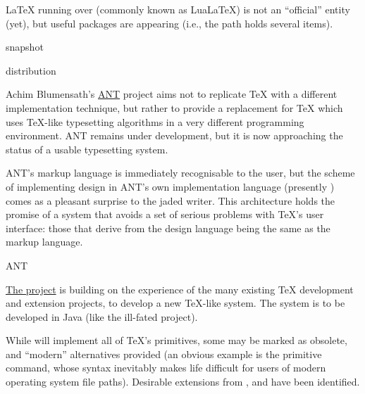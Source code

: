 \LaTeX{} running over \LuaTeX{} (commonly known as Lua\LaTeX{}) is not
an ``official'' entity (yet), but useful packages are
appearing (i.e., the \ctan{} path  holds
several items).
\begin{ctanrefs}
\item[\nothtml{\rmfamily}\LuaTeX{} snapshot]
\item[\nothtml{\rmfamily}\pdftex{} distribution]
\end{ctanrefs}


Achim Blumensath's \href{http://ant.berlios.de}{\textsf{ANT}} project
aims not to replicate \TeX{} with a different implementation
technique, but rather to provide a replacement for \TeX{} which uses
\TeX{}-like typesetting algorithms in a very different programming
environment.  \textsf{ANT} remains under development, but it is now
approaching the status of a usable typesetting system.

\textsf{ANT}'s markup language is immediately recognisable to the
\AllTeX{} user, but the scheme of implementing design in
\textsf{ANT}'s own implementation language (presently
) comes as a pleasant surprise to the jaded 
writer.  This architecture holds the promise of a system that avoids a
set of serious problems with \TeX{}'s user interface: those that
derive from the design language being the same as the markup language.
\begin{ctanrefs}
\item[\textsf{ANT}]
\end{ctanrefs}


\href{http://www.extex.org/}{The \ExTeX{} project} is
building on the experience of the many existing \TeX{} development and
extension projects, to develop a new \TeX{}-like system.  The system
is to be developed in Java (like the ill-fated \NTS{} project).

While \ExTeX{} will implement all of \TeX{}'s primitives, some may be
marked as obsolete, and ``modern'' alternatives provided (an obvious
example is the primitive  command, whose syntax inevitably
makes life difficult for users of modern operating system file
paths).  Desirable extensions from ,
 and 
have been identified.

